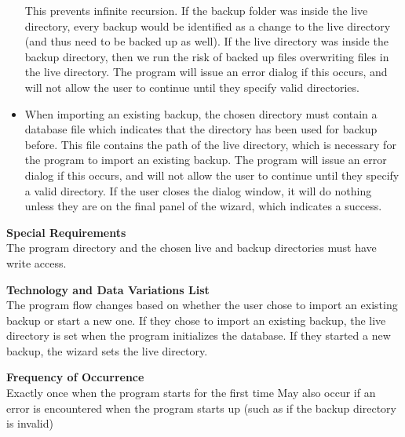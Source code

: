 \documentclass[12pt,a4paper]{article}
\begin{document}
\begin{description}
\begin{itemize}
				This prevents infinite recursion. If the backup folder was inside the live directory, every backup would be identified as a change to the live directory (and thus need to be backed up as well). If the live directory was inside the backup directory, then we 					run the risk of backed up files overwriting files in the live directory. 
				The program will issue an error dialog if this occurs, and will not allow the user to continue until they specify valid directories. 
		\item When importing an existing backup, the chosen directory must contain a database file which indicates that the directory has been used for backup before. 
				This file contains the path of the live directory, which is necessary for the program to import an existing backup. 
				The program will issue an error dialog if this occurs, and will not allow the user to continue until they specify a valid directory. 
				If the user closes the dialog window, it will do nothing unless they are on the final panel of the wizard, which indicates a success. 
	\end{itemize}
	\item \textbf{Special Requirements}\\
		The program directory and the chosen live and backup directories must have write access.
	\item \textbf{Technology and Data Variations List}\\
		The program flow changes based on whether the user chose to import an existing backup or start a new one. If they chose to import an existing backup, the live directory is set when the program initializes the database. If they started a new backup, the wizard sets 		the live directory.
	\item \textbf{Frequency of Occurrence}\\
		Exactly once when the program starts for the first time 
		May also occur if an error is encountered when the program starts up (such as if the backup directory is invalid) 
\end{description}
\end{document}
